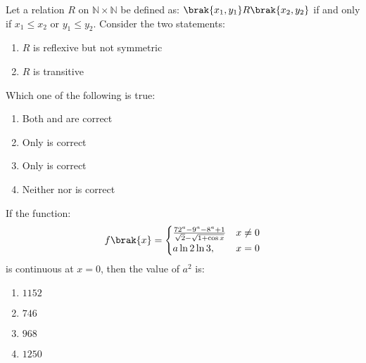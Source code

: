     \item Let a relation $R$ on $\mathbb{N} \times \mathbb{N}$ be defined as: $\brak{x_1, y_1} R \brak{x_2, y_2}$ if and only if $x_1 \leq x_2$ or $y_1 \leq y_2$. Consider the two statements:
   \hfill{}
	    \begin{enumerate}
        \item $R$ is reflexive but not symmetric
        \item $R$ is transitive
    \end{enumerate}
    Which one of the following is true:
   \hfill{}
		\begin{enumerate}
        \item Both  and  are correct
        \item Only  is correct
        \item Only  is correct
        \item Neither  nor  is correct
    \end{enumerate}

    \item If the function:
    $$
		f\brak{x} = 
    \begin{cases}
    \frac{72^a-9^a-8^a+1}{\sqrt{2}-\sqrt{1+\cos x}} &  x \neq 0 \\
    a\ln{2}\ln{3}, &  x = 0
    \end{cases}
    $$
    is continuous at $x = 0$, then the value of $a^2$ is:
   \hfill{}
		\begin{enumerate}
        \item $1152$
        \item $746$
        \item $968$
        \item $1250$
    \end{enumerate}
